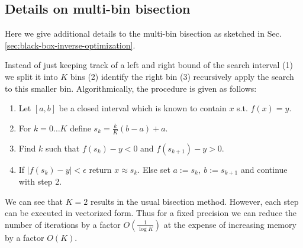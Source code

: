 \documentclass{article}
\begin{document}
\subsection{Details on multi-bin bisection}
Here we give additional details to the multi-bin bisection as sketched in Sec. \ref{sec:black-box-inverse-optimization}.

Instead of just keeping track of a left and right bound of the search interval (1) we split it into $K$ bins (2) identify the right bin (3) recursively apply the search to this smaller bin. Algorithmically, the procedure is given as follows:
\begin{enumerate}
    \item Let $[a, b]$ be a closed interval which is known to contain $x$ s.t. $f(x) = y$.
    \item For $k=0\ldots K$ define $s_{k} = \tfrac{k}{K} (b-a) + a$.
    \item Find $k$ such that $f(s_{k}) - y < 0$ and $f(s_{k+1}) - y > 0$.
    \item If $\left|f(s_{k}) - y\right| < \epsilon$ return $x \approx s_{k}$. Else set $a:= s_{k}, ~ b:= s_{k+1}$ and continue with step 2.
\end{enumerate}
We can see that $K=2$ results in the usual bisection method. However, each step can be executed in vectorized form. Thus for a fixed precision we can reduce the number of iterations by a factor $O\left(\tfrac{1}{\log K}\right)$ at the expense of increasing memory by a factor $O\left(K\right)$.


\end{document}
